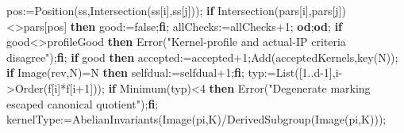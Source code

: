 \documentclass[
  10pt,
  letterpaper,
]{article}
\newenvironment{Shaded}{}{}
\newcommand{\BuiltInTok}[1]{\textcolor[rgb]{0.00,0.50,0.00}{#1}}
\newcommand{\ConstantTok}[1]{\textcolor[rgb]{0.53,0.00,0.00}{#1}}
\newcommand{\ControlFlowTok}[1]{\textcolor[rgb]{0.00,0.44,0.13}{\textbf{#1}}}
\newcommand{\FloatTok}[1]{\textcolor[rgb]{0.25,0.63,0.44}{#1}}
\newcommand{\NormalTok}[1]{#1}
\newcommand{\OperatorTok}[1]{\textcolor[rgb]{0.40,0.40,0.40}{#1}}
\newcommand{\StringTok}[1]{\textcolor[rgb]{0.25,0.44,0.63}{#1}}
\newcommand{\VariableTok}[1]{\textcolor[rgb]{0.10,0.09,0.49}{#1}}
\begin{document}
\begin{Shaded}
\begin{Highlighting}[]
   \VariableTok{pos}\OperatorTok{:=}\BuiltInTok{Position}\NormalTok{(}\VariableTok{ss}\OperatorTok{,}\BuiltInTok{Intersection}\NormalTok{(}\VariableTok{ss}\NormalTok{[}\VariableTok{i}\NormalTok{]}\OperatorTok{,}\VariableTok{ss}\NormalTok{[}\VariableTok{j}\NormalTok{]))}\OperatorTok{;}
   \ControlFlowTok{if} \BuiltInTok{Intersection}\NormalTok{(}\VariableTok{pars}\NormalTok{[}\VariableTok{i}\NormalTok{]}\OperatorTok{,}\VariableTok{pars}\NormalTok{[}\VariableTok{j}\NormalTok{])}\OperatorTok{\textless{}\textgreater{}}\VariableTok{pars}\NormalTok{[}\VariableTok{pos}\NormalTok{] }\ControlFlowTok{then} \VariableTok{good}\OperatorTok{:=}\ConstantTok{false}\OperatorTok{;}\ControlFlowTok{fi}\OperatorTok{;}
   \VariableTok{allChecks}\OperatorTok{:=}\VariableTok{allChecks}\OperatorTok{+}\FloatTok{1}\OperatorTok{;}
  \ControlFlowTok{od}\OperatorTok{;}\ControlFlowTok{od}\OperatorTok{;}
  \ControlFlowTok{if} \VariableTok{good}\OperatorTok{\textless{}\textgreater{}}\VariableTok{profileGood} \ControlFlowTok{then} \BuiltInTok{Error}\NormalTok{(}\StringTok{"Kernel{-}profile and actual{-}IP criteria disagree"}\NormalTok{)}\OperatorTok{;}\ControlFlowTok{fi}\OperatorTok{;}
  \ControlFlowTok{if} \VariableTok{good} \ControlFlowTok{then}
   \VariableTok{accepted}\OperatorTok{:=}\VariableTok{accepted}\OperatorTok{+}\FloatTok{1}\OperatorTok{;}\BuiltInTok{Add}\NormalTok{(}\VariableTok{acceptedKernels}\OperatorTok{,}\VariableTok{key}\NormalTok{(}\VariableTok{N}\NormalTok{))}\OperatorTok{;}
   \ControlFlowTok{if} \BuiltInTok{Image}\NormalTok{(}\VariableTok{rev}\OperatorTok{,}\VariableTok{N}\NormalTok{)}\OperatorTok{=}\VariableTok{N} \ControlFlowTok{then} \VariableTok{selfdual}\OperatorTok{:=}\VariableTok{selfdual}\OperatorTok{+}\FloatTok{1}\OperatorTok{;}\ControlFlowTok{fi}\OperatorTok{;}
   \VariableTok{typ}\OperatorTok{:=}\BuiltInTok{List}\NormalTok{([}\FloatTok{1}\OperatorTok{..}\VariableTok{d}\OperatorTok{{-}}\FloatTok{1}\NormalTok{]}\OperatorTok{,}\VariableTok{i}\OperatorTok{{-}\textgreater{}}\BuiltInTok{Order}\NormalTok{(}\VariableTok{f}\NormalTok{[}\VariableTok{i}\NormalTok{]}\OperatorTok{*}\VariableTok{f}\NormalTok{[}\VariableTok{i}\OperatorTok{+}\FloatTok{1}\NormalTok{]))}\OperatorTok{;}
   \ControlFlowTok{if} \BuiltInTok{Minimum}\NormalTok{(}\VariableTok{typ}\NormalTok{)}\OperatorTok{\textless{}}\FloatTok{4} \ControlFlowTok{then} \BuiltInTok{Error}\NormalTok{(}\StringTok{"Degenerate marking escaped canonical quotient"}\NormalTok{)}\OperatorTok{;}\ControlFlowTok{fi}\OperatorTok{;}
   \VariableTok{kernelType}\OperatorTok{:=}\BuiltInTok{AbelianInvariants}\NormalTok{(}\BuiltInTok{Image}\NormalTok{(}\VariableTok{pi}\OperatorTok{,}\VariableTok{K}\NormalTok{)}\OperatorTok{/}\BuiltInTok{DerivedSubgroup}\NormalTok{(}\BuiltInTok{Image}\NormalTok{(}\VariableTok{pi}\OperatorTok{,}\VariableTok{K}\NormalTok{)))}\OperatorTok{;}

\end{Highlighting}
\end{Shaded}
\end{document}
